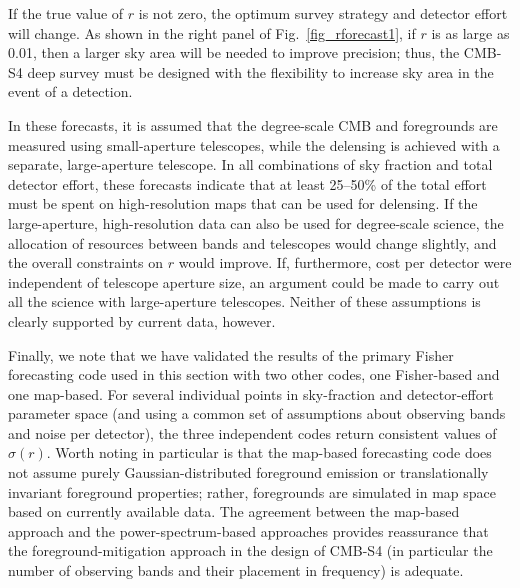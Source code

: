 If the true value of $r$ is not zero, the optimum survey strategy and detector effort will change.
As shown in the right panel of Fig.~\ref{fig_rforecast1}, if $r$ is as large as 0.01, then a larger sky area will be needed to improve precision; thus, the CMB-S4 deep survey must be designed with the flexibility to increase sky area in the event of a detection.

In these forecasts, it is assumed that the degree-scale CMB and foregrounds are measured using small-aperture telescopes, while the delensing is achieved with a separate, large-aperture telescope. 
In all combinations of sky fraction and total detector effort, these forecasts indicate that at least 25--50\% of the total effort must be spent on high-resolution maps that can be used for delensing.
If the large-aperture, high-resolution data can also be used for degree-scale science, the allocation of resources between bands and telescopes would change slightly, and the overall constraints on $r$ would improve. 
If, furthermore, cost per detector were independent of telescope aperture size, an argument could be made to carry out all the science with large-aperture telescopes. 
Neither of these assumptions is clearly supported by current data, however.

Finally, we note that we have validated the results of the primary Fisher forecasting code used in this section with two other codes, one Fisher-based and one map-based. 
For several individual points in sky-fraction and detector-effort parameter space (and using a common set of assumptions about observing bands and noise per detector), the three independent codes return consistent values of $\sigma(r)$.
Worth noting in particular is that the map-based forecasting code does not assume purely Gaussian-distributed foreground emission or translationally invariant foreground properties; rather, foregrounds are simulated in map space based on currently available data.
The agreement between the map-based approach and the power-spectrum-based approaches provides reassurance that the foreground-mitigation approach in the design of CMB-S4 (in particular the number of observing bands and their placement in frequency) is adequate.


